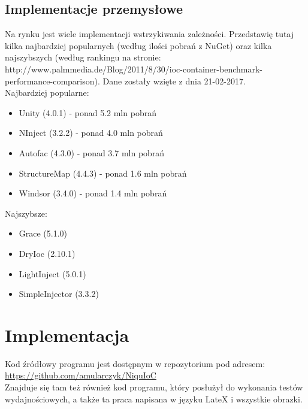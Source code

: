 \documentclass[12pt]{article}
\begin{document}
\subsection{Implementacje przemysłowe}
Na rynku jest wiele implementacji wstrzykiwania zależności. Przedstawię tutaj kilka najbardziej popularnych (według ilości pobrań z NuGet) oraz kilka najszybszych (według rankingu na stronie: http://www.palmmedia.de/Blog/2011/8/30/ioc-container-benchmark-performance-comparison). Dane zostały wzięte z dnia 21-02-2017.\\
Najbardziej popularne:
\begin{itemize}
	\item Unity (4.0.1) - ponad 5.2 mln pobrań
	\item NInject (3.2.2) - ponad 4.0 mln pobrań
	\item Autofac (4.3.0) - ponad 3.7 mln pobrań
	\item StructureMap (4.4.3) - ponad 1.6 mln pobrań
	\item Windsor (3.4.0) - ponad 1.4 mln pobrań
\end{itemize}
Najszybsze:
\begin{itemize}
	\item Grace (5.1.0)
	\item DryIoc (2.10.1)
	\item LightInject (5.0.1)
	\item SimpleInjector (3.3.2)
\end{itemize}



\clearpage

\section{Implementacja}
Kod źródłowy programu jest dostępnym w repozytorium pod adresem: \url{https://github.com/amularczyk/NiquIoC}\\
Znajduje się tam też również kod programu, który posłużył do wykonania testów wydajnościowych, a także ta praca napisana w języku LateX i wszystkie obrazki.
\end{document}
